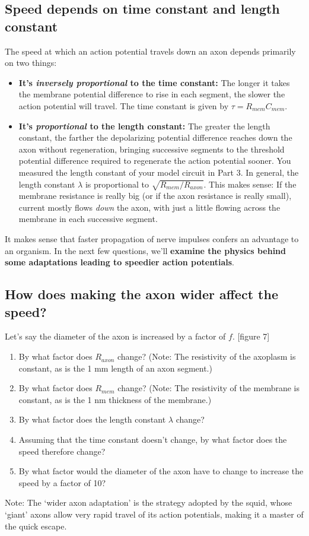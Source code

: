 \subsection*{Speed depends on time constant and length constant}
The speed at which an action potential travels down an axon depends primarily on two things:
\begin{itemize}
\itemsep-0.2em
\item \textbf{It's \emph{inversely proportional} to the time constant:} The longer it takes the membrane potential difference to rise in each segment, the slower the action potential will travel. The time constant is given by $\tau = R_{mem}C_{mem}$.
\item \textbf{It's \emph{proportional} to the length constant:} The greater the length constant, the farther the depolarizing potential difference reaches down the axon without regeneration, bringing successive segments to the threshold potential difference required to regenerate the action potential sooner. You measured the length constant of your model circuit in Part 3. In general, the length constant $\lambda$ is proportional to $\sqrt{R_{mem}/R_{axon}}$. This makes sense: If the membrane resistance is really big (or if the axon resistance is really small), current mostly flows \emph{down} the axon, with just a little flowing across the membrane in each successive segment.
\end{itemize}
\par 
It makes sense that faster propagation of nerve impulses confers an advantage to an organism.
In the next few questions, we'll \textbf{examine the physics behind some adaptations leading to speedier action potentials}.

\newpage

\subsection*{How does making the axon wider affect the speed?}
Let's say the diameter of the axon is increased by a factor of $f$. [figure 7]
\begin{enumerate}
\itemsep-0.2em
\item By what factor does $R_{axon}$ change? (Note: The resistivity of the axoplasm is constant, as is the 1 mm length of an axon segment.)
\item By what factor does $R_{mem}$ change? (Note: The resistivity of the membrane is constant, as is the 1 nm thickness of the membrane.)
\item By what factor does the length constant $\lambda$ change?
\item Assuming that the time constant doesn't change, by what factor does the speed therefore change?
\item By what factor would the diameter of the axon have to change to increase the speed by a factor of 10?
\end{enumerate}
Note: The `wider axon adaptation' is the strategy adopted by the squid, whose `giant' axons allow very rapid travel of its action potentials, making it a master of the quick escape.

